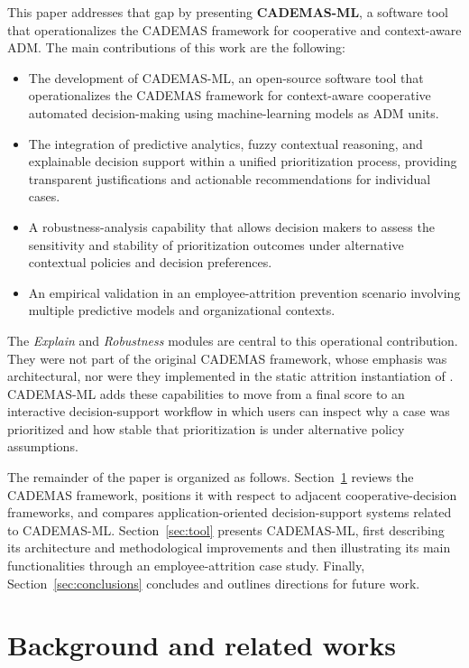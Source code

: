 \documentclass[journal,article,submit,pdftex,moreauthors,mathematics]{Definitions/mdpi}
\begin{document}
This paper addresses that gap by presenting \textbf{CADEMAS-ML}, a software tool that operationalizes the CADEMAS framework for cooperative and context-aware ADM. The main contributions of this work are the following:
\begin{itemize}
\item The development of CADEMAS-ML, an open-source software tool that operationalizes the CADEMAS framework for context-aware cooperative automated decision-making using machine-learning models as ADM units.
\item The integration of predictive analytics, fuzzy contextual reasoning, and explainable decision support within a unified prioritization process, providing transparent justifications and actionable recommendations for individual cases.
\item A robustness-analysis capability that allows decision makers to assess the sensitivity and stability of prioritization outcomes under alternative contextual policies and decision preferences.
\item An empirical validation in an employee-attrition prevention scenario involving multiple predictive models and organizational contexts.
\end{itemize}

The \textit{Explain} and \textit{Robustness} modules are central to this operational contribution. They were not part of the original CADEMAS framework, whose emphasis was architectural, nor were they implemented in the static attrition instantiation of \citet{Godz2026}. CADEMAS-ML adds these capabilities to move from a final score to an interactive decision-support workflow in which users can inspect why a case was prioritized and how stable that prioritization is under alternative policy assumptions.

The remainder of the paper is organized as follows. Section~\ref{sec:background} reviews the CADEMAS framework, positions it with respect to adjacent cooperative-decision frameworks, and compares application-oriented decision-support systems related to CADEMAS-ML. Section~\ref{sec:tool} presents CADEMAS-ML, first describing its architecture and methodological improvements and then illustrating its main functionalities through an employee-attrition case study. Finally, Section~\ref{sec:conclusions} concludes and outlines directions for future work.

\section{Background and related works}\label{sec:background}
\end{document}
